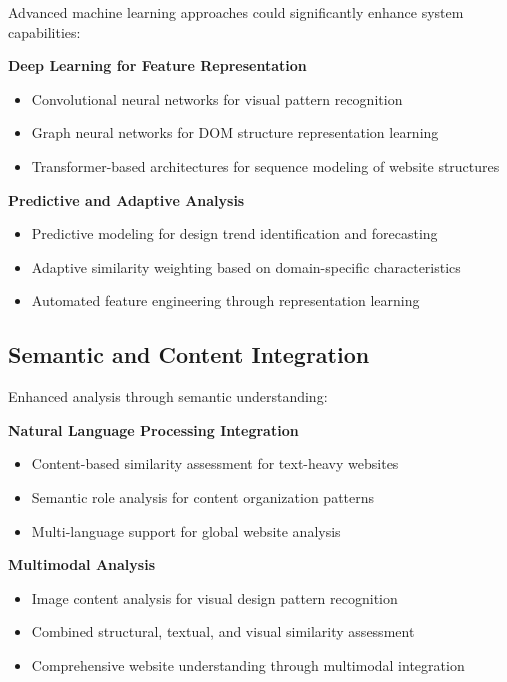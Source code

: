 Advanced machine learning approaches could significantly enhance system capabilities:

\textbf{Deep Learning for Feature Representation}
\begin{itemize}
    \item Convolutional neural networks for visual pattern recognition
    \item Graph neural networks for DOM structure representation learning
    \item Transformer-based architectures for sequence modeling of website structures
\end{itemize}

\textbf{Predictive and Adaptive Analysis}
\begin{itemize}
    \item Predictive modeling for design trend identification and forecasting
    \item Adaptive similarity weighting based on domain-specific characteristics
    \item Automated feature engineering through representation learning
\end{itemize}

\subsection{Semantic and Content Integration}
\label{subsec:semantic-integration}

Enhanced analysis through semantic understanding:

\textbf{Natural Language Processing Integration}
\begin{itemize}
    \item Content-based similarity assessment for text-heavy websites
    \item Semantic role analysis for content organization patterns
    \item Multi-language support for global website analysis
\end{itemize}

\textbf{Multimodal Analysis}
\begin{itemize}
    \item Image content analysis for visual design pattern recognition
    \item Combined structural, textual, and visual similarity assessment
    \item Comprehensive website understanding through multimodal integration
\end{itemize}


